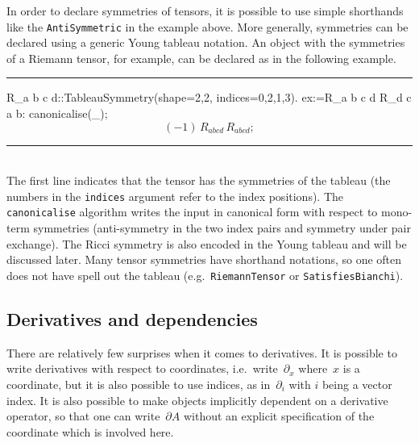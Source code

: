 \documentclass[11pt]{article}
\newcommand{\toprule}{\par\vspace{1ex}\noindent\hspace{25pt}\rule{435pt}{.1pt}}
\newcommand{\botrule}{\noindent\hspace{25pt}\rule{435pt}{.1pt}\\[2ex]}
\newenvironment{cdbin}{\fvset{firstnumber=1}\color[named]{Blue}\Verbatim}{\endVerbatim}
\newenvironment{cdbout}{\vspace{-1ex}\begin{equation}}{\end{equation}\vspace{-1ex}}
\begin{document}
In order to declare symmetries of tensors, it is possible to use
simple shorthands like the \verb|AntiSymmetric| in the example above. 
More generally, symmetries can be declared using  a generic Young
tableau notation. An object with the symmetries of a Riemann tensor,
for example, can be declared as in the following example.
\toprule
\begin{cdbin}
R_{a b c d}::TableauSymmetry(shape={2,2}, indices={0,2,1,3}).
ex:=R_{a b c d} R_{d c a b}:
canonicalise(_);
\end{cdbin}
\begin{cdbout}
(-1)\, R_{a b c d}\, R_{a b c d};
\end{cdbout}
\botrule
The first line indicates that the tensor has the symmetries of the
 tableau (the numbers in the \verb|indices| argument
refer to the index positions). The \verb|canonicalise| algorithm writes
the input in canonical form with respect to mono-term symmetries
(anti-symmetry in the two index pairs and symmetry under pair
exchange). The Ricci symmetry is also encoded in the Young tableau and
will be discussed later. Many tensor symmetries have shorthand
notations, so one often does not have spell out the tableau (e.g.~\verb|RiemannTensor| or \verb|SatisfiesBianchi|).

\subsection{Derivatives and dependencies}
\label{s:derivatives}

There are relatively few surprises when it comes to derivatives.
It is possible to write derivatives with respect to coordinates,
i.e.~write~$\partial_x$ where~$x$ is a coordinate, but
it is also possible to use indices, as in~$\partial_i$ with $i$ being
a vector index. It is also possible to make objects implicitly
dependent on a derivative operator, so that one can write~$\partial
A$ without an explicit specification of the coordinate which is
involved here. 
\end{document}
